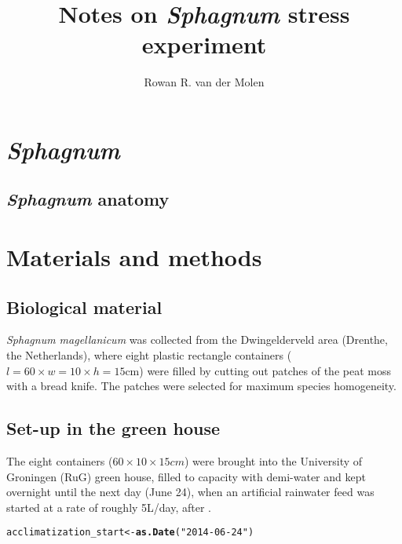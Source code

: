 \documentclass[12pt,a4paper,draft]{article}\usepackage[]{graphicx}\usepackage[]{color}
\title{Notes on {\it Sphagnum} stress experiment}
\author{Rowan R. van der Molen}
\date{}
\makeatletter
\newcommand{\hlstr}[1]{\textcolor[rgb]{0.192,0.494,0.8}{#1}}%
\newcommand{\hlstd}[1]{\textcolor[rgb]{0.345,0.345,0.345}{#1}}%
\newcommand{\hlkwb}[1]{\textcolor[rgb]{0.69,0.353,0.396}{#1}}%
\newcommand{\hlkwd}[1]{\textcolor[rgb]{0.737,0.353,0.396}{\textbf{#1}}}%
\newenvironment{kframe}{%
 \def\at@end@of@kframe{}%
 \ifinner\ifhmode%
  \def\at@end@of@kframe{\end{minipage}}%
  \begin{minipage}{\columnwidth}%
 \fi\fi%
 \def\FrameCommand##1{\hskip\@totalleftmargin \hskip-\fboxsep
 \colorbox{shadecolor}{##1}\hskip-\fboxsep
     \hskip-\linewidth \hskip-\@totalleftmargin \hskip\columnwidth}%
 \MakeFramed {\advance\hsize-\width
   \@totalleftmargin\z@ \linewidth\hsize
   \@setminipage}}%
 {\par\unskip\endMakeFramed%
 \at@end@of@kframe}
\newenvironment{knitrout}{}{} %
\makeatother
\begin{document}
\maketitle
 
\tableofcontents 
  
\section{\textit{Sphagnum}}

\subsection{\textit{Sphagnum} anatomy}


\section{Materials and methods}

\subsection{Biological material}

\textit{Sphagnum magellanicum} was collected from the Dwingelderveld area (Drenthe, the Netherlands), where eight plastic rectangle containers ($l=60 \times w=10 \times h=15$cm) were filled by cutting out patches of the peat moss with a bread knife. The patches were selected for maximum species homogeneity.


\subsection{Set-up in the green house}

The eight containers ($60 \times 10 \times 15cm$) were brought into the University of Groningen (RuG) green house, filled to capacity with demi-water and kept overnight until the next day (June 24), when an artificial rainwater feed was started at a rate of roughly 5L/day, after \citet{lanting2010}.

\begin{knitrout}
\color{fgcolor}\begin{kframe}
\begin{alltt}
\hlstd{acclimatization_start} \hlkwb{<-} \hlkwd{as.Date}\hlstd{(}\hlstr{"2014-06-24"}\hlstd{)}
\end{alltt}
\end{kframe}
\end{knitrout}
\end{document}
